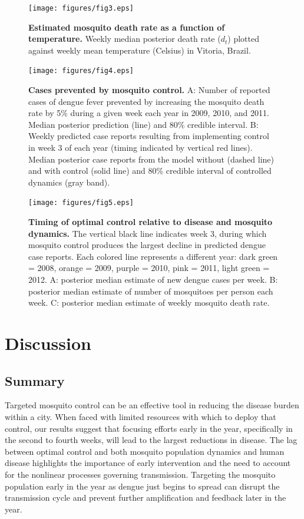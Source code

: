 \documentclass[10pt,letterpaper]{article}
\begin{document}
\begin{figure}[!h]
\texttt{[image: figures/fig3.eps]}
\caption{{\bf Estimated mosquito death rate as a function of temperature.}
Weekly median posterior death rate ($d_t$) plotted against weekly mean temperature (Celsius) in Vitoria, Brazil.
}
\label{temp}
\end{figure}

\begin{figure}[!h]
\texttt{[image: figures/fig4.eps]}
\caption{{\bf Cases prevented by mosquito control.}
A: Number of reported cases of dengue fever prevented by increasing the mosquito death rate by 5\% during a given week each year in 2009, 2010, and 2011. Median posterior prediction (line) and 80\% credible interval. B: Weekly predicted case reports resulting from implementing control in week 3 of each year (timing indicated by vertical red lines).  Median posterior case reports from the model without (dashed line) and with control (solid line) and 80\% credible interval of controlled dynamics (gray band).
}
\label{control}
\end{figure}

\begin{figure}[!h]
\texttt{[image: figures/fig5.eps]}
\caption{{\bf Timing of optimal control relative to disease and mosquito dynamics.}
The vertical black line indicates week 3, during which mosquito control produces the largest decline in predicted dengue case reports. Each colored line represents a different year: dark green = 2008, orange = 2009, purple = 2010, pink = 2011, light green = 2012. A: posterior median estimate of new dengue cases per week. B: posterior median estimate of number of mosquitoes per person each week. C: posterior median estimate of weekly mosquito death rate.
}
\label{timing}
\end{figure}

\section*{Discussion}

\subsection*{Summary}

Targeted mosquito control can be an effective tool in reducing the disease burden within a city.
When faced with limited resources with which to deploy that control, our results suggest that focusing efforts early in the year, specifically in the second to fourth weeks, will lead to the largest reductions in disease.
The lag between optimal control and both mosquito population dynamics and human disease highlights the importance of early intervention and the need to account for the nonlinear processes governing transmission.
Targeting the mosquito population early in the year as dengue just begins to spread can disrupt the transmission cycle and prevent further amplification and feedback later in the year.
\end{document}
